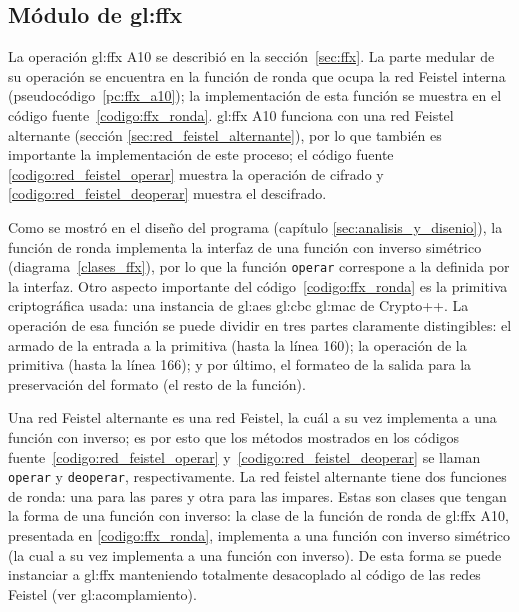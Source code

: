 %
%
%

\subsection{Módulo de \texorpdfstring{\acrshort{gl:ffx}}{FFX}}

La operación \gls{gl:ffx} A10 se describió en la sección~\ref{sec:ffx}. La
parte medular de su operación se encuentra en la función de ronda que ocupa
la red Feistel interna (pseudocódigo~\ref{pc:ffx_a10}); la implementación de
esta función se muestra en el código fuente~\ref{codigo:ffx_ronda}.
\gls{gl:ffx} A10 funciona con una red Feistel alternante (sección
\ref{sec:red_feistel_alternante}), por lo que también es importante la
implementación de este proceso; el código fuente
\ref{codigo:red_feistel_operar} muestra la operación de cifrado y
\ref{codigo:red_feistel_deoperar} muestra el descifrado.


Como se mostró en el diseño del programa (capítulo
\ref{sec:analisis_y_disenio}), la función de ronda implementa la
interfaz de una función con inverso simétrico (diagrama~\ref{clases_ffx}), por
lo que la función \texttt{operar} correspone a la definida por la interfaz.
Otro aspecto importante del código~\ref{codigo:ffx_ronda} es la primitiva
criptográfica usada: una instancia de \gls{gl:aes} \gls{gl:cbc} \gls{gl:mac} de
Crypto++. La operación de esa función se puede dividir en tres partes
claramente distingibles: el armado de la entrada a la primitiva (hasta la línea
160); la operación de la primitiva (hasta la línea 166); y por último, el
formateo de la salida para la preservación del formato (el resto de la función).



Una red Feistel alternante es una red Feistel, la cuál a su vez implementa a
una función con inverso; es por esto que los métodos mostrados en los códigos
fuente~\ref{codigo:red_feistel_operar} y~\ref{codigo:red_feistel_deoperar} se
llaman \texttt{operar} y \texttt{deoperar}, respectivamente. La red feistel
alternante tiene dos funciones de  ronda: una para las pares y otra para las
impares. Estas son clases que  tengan la forma de una función con inverso: la
clase de la función de ronda de \gls{gl:ffx} A10, presentada en
\ref{codigo:ffx_ronda}, implementa a una función con inverso simétrico (la cual
a su vez implementa a una función con inverso). De esta forma se puede
instanciar a \gls{gl:ffx} manteniendo totalmente desacoplado al código de las
redes Feistel (ver \gls{gl:acomplamiento}).


